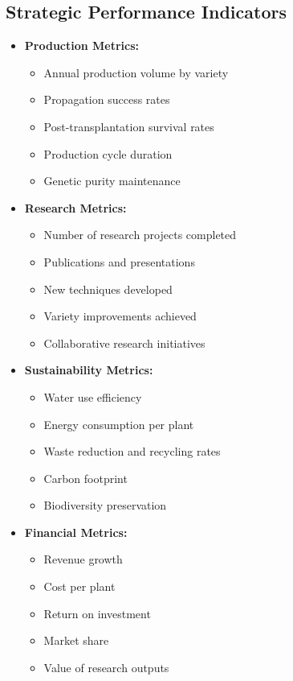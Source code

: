\subsection{Strategic Performance Indicators}
\begin{itemize}
    \item \textbf{Production Metrics:}
    \begin{itemize}
        \item Annual production volume by variety
        \item Propagation success rates
        \item Post-transplantation survival rates
        \item Production cycle duration
        \item Genetic purity maintenance
    \end{itemize}
    
    \item \textbf{Research Metrics:}
    \begin{itemize}
        \item Number of research projects completed
        \item Publications and presentations
        \item New techniques developed
        \item Variety improvements achieved
        \item Collaborative research initiatives
    \end{itemize}
    
    \item \textbf{Sustainability Metrics:}
    \begin{itemize}
        \item Water use efficiency
        \item Energy consumption per plant
        \item Waste reduction and recycling rates
        \item Carbon footprint
        \item Biodiversity preservation
    \end{itemize}
    
    \item \textbf{Financial Metrics:}
    \begin{itemize}
        \item Revenue growth
        \item Cost per plant
        \item Return on investment
        \item Market share
        \item Value of research outputs
    \end{itemize}
\end{itemize}

